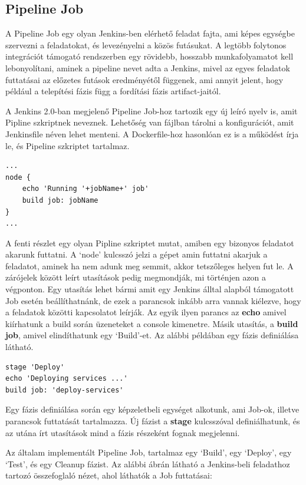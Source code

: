 \documentclass[11pt,magyar,a4paper,twoside,]{report}
\begin{document}
\subsection{Pipeline Job}\label{pipeline-job}

A Pipeline Job egy olyan Jenkins-ben elérhető feladat fajta, ami képes
egységbe szervezni a feladatokat, és levezényelni a közös futásukat. A
legtöbb folytonos integrációt támogató rendszerben egy rövidebb,
hosszabb munkafolyamatot kell lebonyolítani, aminek a pipeline nevet
adta a Jenkins, mivel az egyes feladatok futtatásai az előzetes futások
eredményétől függenek, ami annyit jelent, hogy például a telepítési
fázis függ a fordítási fázis artifact-jaitól.

A Jenkins 2.0-ban megjelenő Pipeline Job-hoz tartozik egy új leíró nyelv
is, amit Pipline szkriptnek neveznek. Lehetőség van fájlban tárolni a
konfigurációt, amit Jenkinsfile néven lehet menteni. A Dockerfile-hoz
hasonlóan ez is a működést írja le, és Pipeline szkriptet tartalmaz.

\begin{verbatim}
...
node {
    echo 'Running '+jobName+' job'
    build job: jobName
}
...
\end{verbatim}

A fenti részlet egy olyan Pipline szkriptet mutat, amiben egy bizonyos
feladatot akarunk futtatni. A `node' kulcsszó jelzi a gépet amin
futtatni akarjuk a feladatot, aminek ha nem adunk meg semmit, akkor
tetszőleges helyen fut le. A zárójelek között leírt utasítások pedig
megmondják, mi történjen azon a végponton. Egy utasítás lehet bármi amit
egy Jenkins álltal alapból támogatott Job esetén beállíthatnánk, de ezek
a parancsok inkább arra vannak kiélezve, hogy a feladatok közötti
kapcsolatot leírják. Az egyik ilyen parancs az \textbf{echo} amivel
kiírhatunk a build során üzeneteket a console kimenetre. Másik utasítás,
a \textbf{build job}, amivel elindíthatunk egy `Build'-et. Az alábbi
példában egy fázis definiálása látható.

\begin{verbatim}
stage 'Deploy'
echo 'Deploying services ...'
build job: 'deploy-services'
\end{verbatim}

Egy fázis definiálása során egy képzeletbeli egységet alkotunk, ami
Job-ok, illetve parancsok futtatását tartalmazza. Új fázist a
\textbf{stage} kulcsszóval definiálhatunk, és az utána írt utasítások
mind a fázis részeként fognak megjelenni.

Az általam implementált Pipeline Job, tartalmaz egy `Build', egy
`Deploy', egy `Test', és egy Cleanup fázist. Az alábbi ábrán látható a
Jenkins-beli feladathoz tartozó összefoglaló nézet, ahol láthatók a Job
futtatásai:
\end{document}
